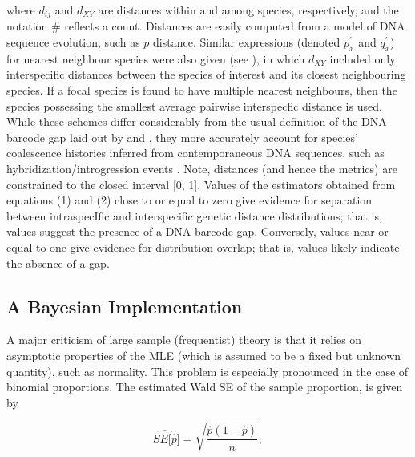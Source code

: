 \documentclass[12pt]{article}
\begin{document}
\noindent where $d_{ij}$ and $d_{XY}$ are distances within and among species, respectively, and the notation \# reflects a count. Distances are easily computed from a model of DNA sequence evolution, such as $p$ distance. Similar expressions (denoted $p^{'}_x$ and $q^{'}_x$) for nearest neighbour species were also given (see \cite{phillips2024measure}), in which $d_{XY}$ included only interspecific distances between the species of interest and its closest neighbouring species. If a focal species is found to have multiple nearest neighbours, then the species possessing the smallest average pairwise interspecfic distance is used. While these schemes differ considerably from the usual definition of the DNA barcode gap laid out by \citet{meyer2005dna} and \citet{meier2008use}, they more accurately account for species' coalescence histories inferred from contemporaneous DNA sequences. such as hybridization/introgression events \citep{phillips2024measure}. Note, distances (and hence the metrics) are constrained to the closed interval [0, 1]. Values of the estimators obtained from equations (1) and (2) close to or equal to zero give evidence for separation between intraspecIfic and interspecific genetic distance distributions; that is, values suggest the presence of a DNA barcode gap. Conversely, values near or equal to one give evidence for distribution overlap; that is, values likely indicate the absence of a gap.


\subsection{A Bayesian Implementation}

A major criticism of large sample (frequentist) theory is that it relies on asymptotic properties of the MLE (which is assumed to be a fixed but unknown quantity), such as normality. This problem is especially pronounced in the case of binomial proportions. The estimated Wald SE of the sample proportion, is given by 

\begin{equation}
\widehat{SE[\hat{p}}] = \sqrt{\frac{\hat{p}(1 - \hat{p})}{n}},
\end{equation}
\end{document}
